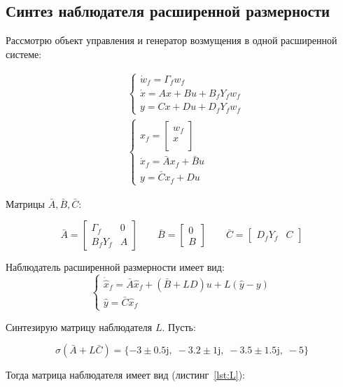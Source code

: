 \documentclass[a4paper,12pt]{article}
\begin{document}
	\subsection{Синтез наблюдателя расширенной размерности}
	
	
	Рассмотрю объект управления и генератор возмущения в одной расширенной системе:
	
	\begin{align*}
		&\begin{cases}
			\dot w_f = \Gamma_f w_f \\
			\dot x = A x + B u + B_f Y_f w_f \\
			y = C x + D u + D_f Y_f w_f
		\end{cases} \\
		&\begin{cases}
			x_f = \begin{bmatrix}
				w_f \\ x \\
			\end{bmatrix} \\
			\dot x_f = \bar{A} x_f + \bar B u \\
			y = \bar C x_f + D u
		\end{cases}
	\end{align*}
	
	Матрицы \(\bar A, \bar B, \bar C\):
	
	\[
	\bar{A}=
	\begin{bmatrix}
		\Gamma_f&0\\
		B_fY_f&A
	\end{bmatrix} \qquad
	\bar B = \begin{bmatrix}
		0 \\ B
	\end{bmatrix} 
	\qquad
		\bar C = \begin{bmatrix}
		D_f Y_f & C
	\end{bmatrix}
	\]
	
	Наблюдатель расширенной размерности имеет вид:
	\[
	\begin{cases}
		\dot{\hat{x}}_f=\bar{A}\hat{x}_f+(\bar{B}+LD)u+L(\hat{y}-y)\\
		\hat{y}=\bar{C}\hat{x}_f
	\end{cases}
	\]
	
	Синтезирую матрицу наблюдателя \(L\). Пусть:
	
	\[
	\sigma(\bar A + L \bar C) = \{-3\pm0.5\mathrm{j},\; -3.2\pm1\mathrm{j},\; -3.5\pm1.5\mathrm{j},\; -5\}
	\]
	
	Тогда матрица наблюдателя имеет вид (листинг~\ref{lst:L}):
	
\end{document}
